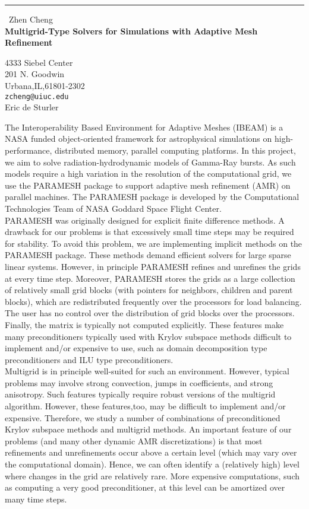 \documentclass{report}
\begin{document}
\begin{center}
\rule{6in}{1pt} \
{\large Zhen Cheng \\
{\bf Multigrid-Type Solvers for Simulations with Adaptive Mesh Refinement}}

4333 Siebel Center \\ 201 N. Goodwin \\ Urbana,IL,61801-2302
\\
{\tt zcheng@uiuc.edu}\\
Eric de Sturler\end{center}

The Interoperability Based Environment for Adaptive Meshes (IBEAM) is
a NASA funded object-oriented framework for astrophysical
simulations on high-performance, distributed memory, parallel
computing platforms. In this project, we aim to solve
radiation-hydrodynamic models of Gamma-Ray bursts. As such
models require a high variation in the resolution of the computational grid,
we use the PARAMESH package to support adaptive mesh refinement (AMR) on
parallel machines. The PARAMESH package is developed by the Computational Technologies
Team of NASA Goddard Space Flight Center.\\

PARAMESH was originally designed for explicit finite difference
methods. A drawback for our problems is that excessively small
time steps may be required for stability. To avoid this problem,
we are implementing implicit methods on the PARAMESH package.
These methods demand efficient solvers for large sparse linear
systems. However, in principle PARAMESH refines and unrefines the
grids at every time step. Moreover, PARAMESH stores the grids as a
large collection of relatively small grid blocks (with pointers
for neighbors, children and parent blocks), which are
redistributed frequently over the processors for load balancing.
The user has no control over the distribution of grid blocks over
the processors. Finally, the matrix is typically not computed
explicitly. These features make many preconditioners typically
used with Krylov subspace methods difficult to implement and/or
expensive to use, such as domain decomposition type
preconditioners and ILU type
preconditioners.\\

Multigrid is in principle well-suited for such an environment. However,
typical problems may involve strong convection, jumps in coefficients, and
strong anisotropy. Such features typically require robust versions of the
multigrid algorithm. However, these features,too, may be difficult to implement
and/or expensive. Therefore, we study a number of combinations of
preconditioned Krylov subspace methods and multigrid methods. An important feature
of our problems (and many other dynamic AMR discretizations) is that most refinements
and unrefinements occur above a certain level (which may vary over the computational
domain). Hence, we can often identify a (relatively high) level where changes in the
grid are relatively rare. More expensive computations, such as computing a very good
preconditioner, at this level can be amortized over many time steps.\\
\end{document}
